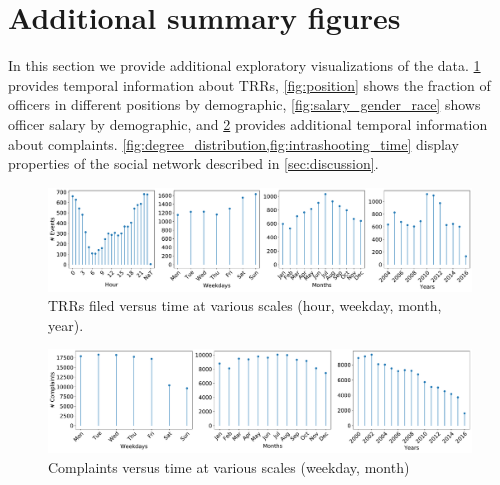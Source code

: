 \section{Additional summary figures}\label{sec:additional_figs}

In this section we provide additional exploratory visualizations 
of the data. \cref{fig:trrs_times} provides temporal information
about TRRs, \cref{fig:position} shows the fraction of officers 
in different positions by demographic, \cref{fig:salary_gender_race}
shows officer salary by demographic, 
and \cref{fig:complaints_times} provides additional temporal information about complaints.
\cref{fig:degree_distribution,fig:intrashooting_time} display properties 
of the social network described in \cref{sec:discussion}.

\begin{figure}[ht!] 
	\includegraphics[width=\textwidth]{figs/trrs_times} 
	\caption{TRRs filed versus time at various scales (hour, weekday, month, year).} \label{fig:trrs_times}
\end{figure}
\hfill
\begin{figure}[ht!]
	\includegraphics[width=\textwidth, clip, trim= 0 0 460 0]{figs/complaints_times} 
\caption{Complaints versus time at various scales (weekday, month)}\label{fig:complaints_times}
\end{figure}

